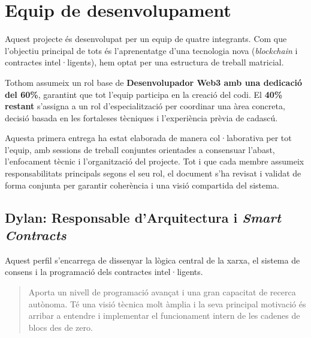 \section{Equip de desenvolupament}


Aquest projecte és desenvolupat per un equip de quatre integrants. Com que l'objectiu principal de tots és l'aprenentatge d'una tecnologia nova (\textit{blockchain} i contractes intel·ligents), hem optat per una estructura de treball matricial. 

Tothom assumeix un rol base de \textbf{Desenvolupador Web3 amb una dedicació del 60\%}, garantint que tot l'equip participa en la creació del codi. El \textbf{40\% restant} s'assigna a un rol d'especialització per coordinar una àrea concreta, decisió basada en les fortaleses tècniques i l'experiència prèvia de cadascú.

Aquesta primera entrega ha estat elaborada de manera col·laborativa per tot l'equip, amb sessions de treball conjuntes orientades a consensuar l'abast, l'enfocament tècnic i l'organització del projecte.
Tot i que cada membre assumeix responsabilitats principals segons el seu rol, el document s'ha revisat i validat de forma conjunta per garantir coherència i una visió compartida del sistema.

\subsection{Dylan: Responsable d'Arquitectura i \textit{Smart Contracts}}

Aquest perfil s'encarrega de dissenyar la lògica central de la xarxa, el sistema de consens i la programació dels contractes intel·ligents.

\begin{quote}
    Aporta un nivell de programació avançat i una gran capacitat de recerca autònoma. Té una visió tècnica molt àmplia i la seva principal motivació és arribar a entendre i implementar el funcionament intern de les cadenes de blocs des de zero.
\end{quote}



